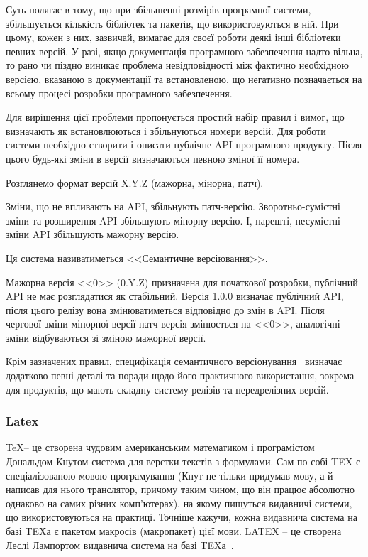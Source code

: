 Суть полягає в тому, що при збільшенні розмірів програмної системи, збільшується кількість бібліотек та пакетів, що використовуються в ній. При цьому, кожен з них, зазвичай, вимагає для своєї роботи деякі інші бібліотеки певних версій. У разі, якщо документація програмного забезпечення надто вільна, то рано чи піздно виникає проблема невідповідності між фактично необхідною версією, вказаною в документації та встановленою, що негативно позначається на всьому процесі розробки програмного забезпечення.

Для вирішення цієї проблеми пропонується простий набір правил і вимог, що визначають як встановлюються і збільнуються номери версій. Для роботи системи необхідно створити і описати публічне API програмного продукту. Після цього будь-які зміни в версії визначаються певною зміної її номера.

Розглянемо формат версій X.Y.Z (мажорна, мінорна, патч).

Зміни, що не впливають на API, збільнують патч-версію. Зворотньо-сумістні зміни та розширення API збільшують мінорну версію. І, нарешті, несумістні зміни API збільшують мажорну версію.

Ця система називатиметься <<Семантичне версіювання>>.

Мажорна версія <<0>> (0.Y.Z) призначена для початкової розробки, публічний API не має розглядатися як стабільний. Версія 1.0.0 визначає публічний API, після цього релізу вона змінюватиметься відповідно до змін в API. Після чергової зміни мінорної версії патч-версія змінюється на <<0>>, аналогічні зміни відбуваються зі зміною мажорної версії.

Крім зазначених правил, специфікація семантичного версіонування~\cite{semver} визначає додатково певні деталі та поради щодо його практичного використання, зокрема для продуктів, що мають складну систему релізів та передрелізних версій.

\subsubsection{Latex} \label{subsub:latex}

\TeX -- це створена чудовим американським математиком і програмістом Дональдом Кнутом система для верстки текстів з формулами. Сам по собі TEX є спеціалізованою мовою програмування (Кнут не тільки придумав мову, а й написав для нього транслятор, причому таким чином, що він працює абсолютно однаково на самих різних комп'ютерах), на якому пишуться видавничі системи, що використовуються на практиці. Точніше кажучи, кожна видавнича система на базі TEXа є пакетом макросів (макропакет) цієї мови. LATEX -- це створена Леслі Лампортом видавнича система на базі TEXа~\cite{львовский2003latex}.

